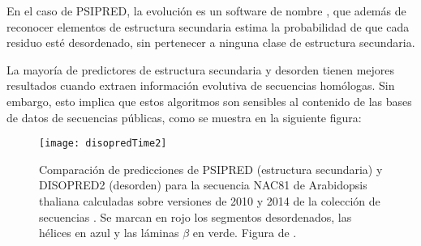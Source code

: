 En el caso de PSIPRED, la evoluci\'{o}n es un software de nombre
 \citep{Ward2004},
que adem\'{a}s de reconocer elementos de estructura secundaria estima la probabilidad de que cada residuo est\'{e} desordenado,
sin pertenecer a ninguna clase de estructura secundaria.

La mayor\'{i}a de predictores de estructura secundaria y desorden tienen mejores resultados cuando
extraen informaci\'{o}n evolutiva de secuencias hom\'{o}logas. Sin embargo, esto implica que 
estos algoritmos son sensibles al contenido de las bases de datos de secuencias p\'{u}blicas, 
como se muestra en la siguiente figura:

\begin{figure}
\begin{center} 
\texttt{[image: disopredTime2]}
\caption%
{
Comparaci\'{o}n de predicciones de PSIPRED (estructura secundaria) y DISOPRED2 (desorden) 
para la secuencia NAC81 de Arabidopsis thaliana calculadas sobre versiones de 2010 y 2014 
de la colecci\'{o}n de secuencias .
Se marcan en rojo los segmentos desordenados, las h\'{e}lices en azul y las l\'{a}minas $\beta$ en verde.
Figura de \citet{Yruela2014}.
}
\label{fig:disopredTime}
\end{center}
\end{figure}


